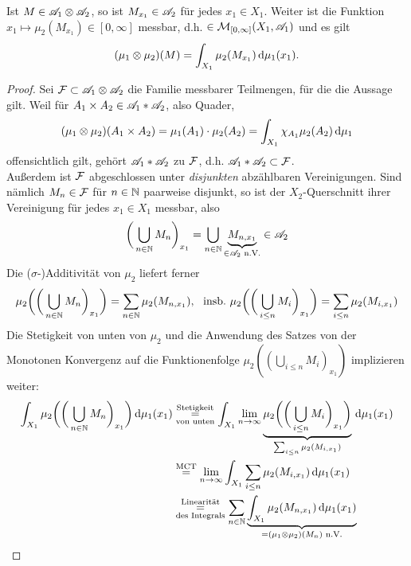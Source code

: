 \begin{satz}
\begin{mdframed}
Ist $M\in \AA_1\otimes \AA_2$, so ist $M_{x_1}\in \AA_2$ für jedes $x_1\in X_1$. Weiter ist die Funktion $x_1 \mapsto \mu_2(M_{x_1}) \in [0,\infty]$ messbar, d.h. $\in\MM_{[0,\infty]}(X_1,\AA_1)$ und es gilt
\begin{equation}
(\mu_1\otimes \mu_2)(M)=\int_{X_1}\mu_2(M_{x_1})\D\mu_1(x_1).
\end{equation}
\end{mdframed}
\begin{proof}
Sei $\FF \subset \AA_1 \otimes \AA_2$ die Familie messbarer Teilmengen, für die die Aussage gilt. Weil für $A_1\times A_2\in \AA_1 \ast \AA_2$, also Quader,
$$(\mu_1 \otimes \mu_2)(A_1\times A_2)=\mu_1(A_1)\cdot \mu_2(A_2) = \int_{X_1}\chi_{A_1}\mu_2(A_2)\D \mu_1$$
offensichtlich gilt, gehört $\AA_1 \ast \AA_2$ zu $\FF$, d.h. $\AA_1 \ast \AA_2 \subset \FF$. \vspace{0.3pc}\\
Außerdem ist $\FF$ abgeschlossen unter \emph{disjunkten} abzählbaren Vereinigungen. Sind nämlich $M_n \in \FF$ für $n\in \N$ paarweise disjunkt, so ist der $X_2$-Querschnitt ihrer Vereinigung für jedes $x_1 \in X_1$ messbar, also 
$$\bigg( \bigcup_{n\in \N} M_n \bigg)_{x_1} = \bigcup_{n\in \N} \underbrace{M_{n,x_1}}_{\in \AA_2 \te{ n.V.}} \in \AA_2$$
Die ($\sigma$-)Additivität von $\mu_2$ liefert ferner
$$\mu_2 \bigg(\bigg( \bigcup_{n\in\N} M_n\bigg)_{x_1}\bigg)=\sum_{n\in\N} \mu_2(M_{n,x_1}), \ \  \te{insb.} \ \mu_2 \bigg(\bigg( \bigcup_{ i \leq n} M_i\bigg)_{x_1}\bigg)=\sum_{i \leq n} \mu_2(M_{i,x_1})$$
Die Stetigkeit von unten von $\mu_2$ und die Anwendung des Satzes von der Monotonen Konvergenz auf die Funktionenfolge $\mu_2\left(\left(\bigcup\limits_{i\leq n} M_i\right)_{x_1}\right)$ implizieren weiter:
\begin{equation*}
\begin{split}
\int_{X_1}  \mu_2\bigg( \bigg( \bigcup_{n\in\N} M_n \bigg)_{x_1}\bigg)\D\mu_1(x_1)
& \underset{\te{von unten}}{\overset{\te{Stetigkeit}}=} 
\int_{X_1} \lim_{n\to \infty} \underbrace{\mu_2\bigg(\bigg(\bigcup\limits_{i \leq n} M_i\bigg)_{x_1}\bigg)}_{\sum_{i \leq n} \mu_2(M_{i,x_1})} \D \mu_1(x_1)  \\
& \overset{\te{MCT}}=  \lim_{n\to\infty}  \int_{X_1} \sum_{i\leq n} \mu_2(M_{i,x_1})\D\mu_1(x_1) \\
& \underset{\te{des Integrals}}{\overset{\te{Linearität}}=} \sum_{n \in \N} \underbrace{\int_{X_1}\mu_2 (M_{n,x_1})\D\mu_1(x_1)}_{=(\mu_1\otimes \mu_2)(M_{n}) \te{ n.V.}} \\

\end{split}
\end{equation*}
\end{proof}
\end{satz}
